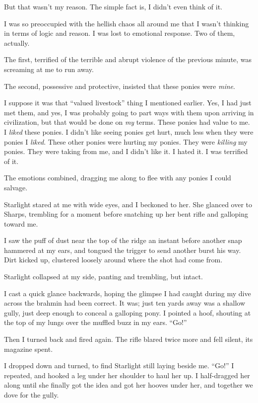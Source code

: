 But that wasn’t my reason. The simple fact is, I didn’t even think of it.

I was so preoccupied with the hellish chaos all around me that I wasn’t thinking in terms of logic and reason. I was lost to emotional response. Two of them, actually.

The first, terrified of the terrible and abrupt violence of the previous minute, was screaming at me to run away.

The second, possessive and protective, insisted that these ponies were \textit{mine}.

I suppose it was that “valued livestock” thing I mentioned earlier. Yes, I had just met them, and yes, I was probably going to part ways with them upon arriving in civilization, but that would be done on \textit{my} terms. These ponies had value to me. I \textit{liked} these ponies. I didn’t like seeing ponies get hurt, much less when they were ponies I \textit{liked}. These other ponies were hurting my ponies. They were \textit{killing} my ponies. They were taking from me, and I didn’t like it. I hated it. I was terrified of it.

The emotions combined, dragging me along to flee with any ponies I could salvage.

Starlight stared at me with wide eyes, and I beckoned to her. She glanced over to Sharps, trembling for a moment before snatching up her bent rifle and galloping toward me.

I saw the puff of dust near the top of the ridge an instant before another snap hammered at my ears, and tongued the trigger to send another burst his way. Dirt kicked up, clustered loosely around where the shot had come from.

Starlight collapsed at my side, panting and trembling, but intact.

I cast a quick glance backwards, hoping the glimpse I had caught during my dive across the brahmin had been correct. It was; just ten yards away was a shallow gully, just deep enough to conceal a galloping pony. I pointed a hoof, shouting at the top of my lungs over the muffled buzz in my ears. “Go!”

Then I turned back and fired again. The rifle blared twice more and fell silent, its magazine spent.

I dropped down and turned, to find Starlight still laying beside me. “Go!” I repeated, and hooked a leg under her shoulder to haul her up. I half-dragged her along until she finally got the idea and got her hooves under her, and together we dove for the gully.

